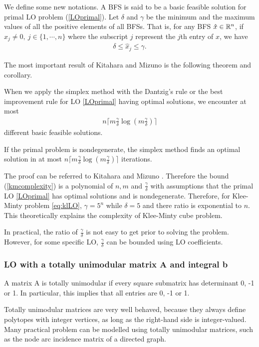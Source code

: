 \documentclass[11pt]{article}
\begin{document}
We define some new notations. A BFS is said to be a basic feasible solution for primal LO problem (\ref{LOprimal}). Let $\delta$ and $\gamma$ be the minimum and the maximum values of all the positive elements of all BFSs. That is, for any BFS $\hat{x} \in \mathbb{R}^{n}$, if $\hat{x}_j \neq 0, \ j \in \{1, \cdots, n\}$ where the subscript $j$ represent the $j$th entry of $\hat{x}$, we have 
\begin{align}
\delta \le \hat{x}_j \le \gamma. \label{eq:bfsbound}
\end{align} 

The most important result of Kitahara and Mizuno \cite{kitahara2013bound} is the following theorem and corollary.
\begin{theorem}
When we apply the simplex method with the Dantzig's rule or the best improvement rule for LO \ref{LOprimal} having optimal solutions, we encounter at most
\begin{align}
n\lceil m \frac{\gamma}{\delta}\log(m\frac{\gamma}{\delta})\rceil \label{kmcomplexity}
\end{align}
different basic feasible solutions. \label{KTheorem1}
\end{theorem}

\begin{corollary}
 If the primal problem is nondegenerate, the simplex method finds an optimal solution in at most $n\lceil m \frac{\gamma}{\delta}\log(m\frac{\gamma}{\delta})\rceil$ iterations.
\end{corollary}

The proof can be referred to Kitahara and Mizuno \cite{kitahara2013bound}. Therefore the bound (\ref{kmcomplexity}) is a polynomial of $n, m$ and $\frac{\gamma}{\delta}$ with assumptions that the primal LO \ref{LOprimal} has optimal solutions and is nondegenerate. Therefore, for Klee-Minty problem \ref{eq:klLO}, $\gamma = 5^n$ while $\delta = 5$ and there ratio is exponential to $n$. This theoretically explains the complexity of Klee-Minty cube problem.

In practical, the ratio of $\frac{\gamma}{\delta}$ is not easy to get prior to solving the problem. However, for some specific LO, $\frac{\gamma}{\delta}$ can be bounded using LO coefficients. 
\subsubsection{LO with a totally unimodular matrix A and integral b}
\begin{definition}
A matrix A is totally unimodular if every square submatrix has determinant 0, -1 or 1. In particular, this implies that all entries are 0, -1 or 1.
\end{definition}
Totally unimodular matrices are very well behaved, because they always define polytopes with integer vertices, as long as the right-hand side is integer-valued. Many practical problem can be modelled using totally unimodular matrices, such as the node arc incidence matrix of a directed graph.
\end{document}
